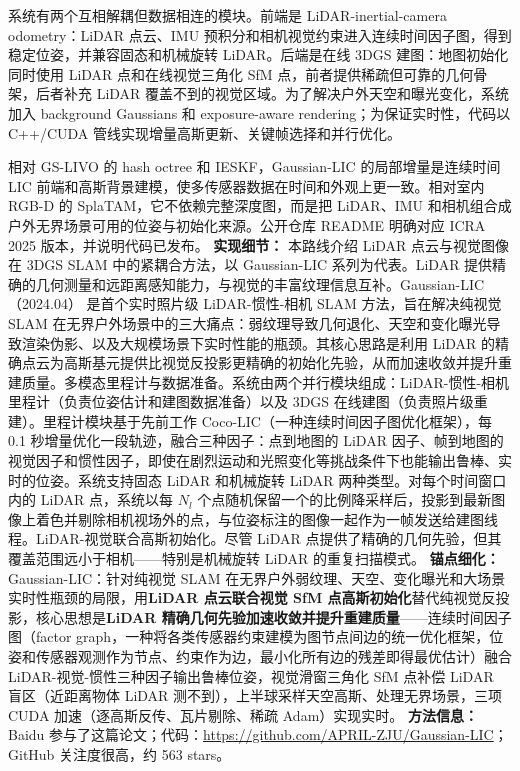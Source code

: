 系统有两个互相解耦但数据相连的模块。前端是 LiDAR-inertial-camera odometry：LiDAR 点云、IMU 预积分和相机视觉约束进入连续时间因子图，得到稳定位姿，并兼容固态和机械旋转 LiDAR。后端是在线 3DGS 建图：地图初始化同时使用 LiDAR 点和在线视觉三角化 SfM 点，前者提供稀疏但可靠的几何骨架，后者补充 LiDAR 覆盖不到的视觉区域。为了解决户外天空和曝光变化，系统加入 background Gaussians 和 exposure-aware rendering；为保证实时性，代码以 C++/CUDA 管线实现增量高斯更新、关键帧选择和并行优化。

相对 GS-LIVO 的 hash octree 和 IESKF，Gaussian-LIC 的局部增量是连续时间 LIC 前端和高斯背景建模，使多传感器数据在时间和外观上更一致。相对室内 RGB-D 的 SplaTAM，它不依赖完整深度图，而是把 LiDAR、IMU 和相机组合成户外无界场景可用的位姿与初始化来源。公开仓库 README 明确对应 ICRA 2025 版本，并说明代码已发布。
\textbf{实现细节：} 本路线介绍 LiDAR 点云与视觉图像在 3DGS SLAM 中的紧耦合方法，以 Gaussian-LIC 系列为代表。LiDAR 提供精确的几何测量和远距离感知能力，与视觉的丰富纹理信息互补。Gaussian-LIC（2024.04） 是首个实时照片级 LiDAR-惯性-相机 SLAM 方法，旨在解决纯视觉 SLAM 在无界户外场景中的三大痛点：弱纹理导致几何退化、天空和变化曝光导致渲染伪影、以及大规模场景下实时性能的瓶颈。其核心思路是利用 LiDAR 的精确点云为高斯基元提供比视觉反投影更精确的初始化先验，从而加速收敛并提升重建质量。多模态里程计与数据准备。系统由两个并行模块组成：LiDAR-惯性-相机里程计（负责位姿估计和建图数据准备）以及 3DGS 在线建图（负责照片级重建）。里程计模块基于先前工作 Coco-LIC（一种连续时间因子图优化框架），每 0.1 秒增量优化一段轨迹，融合三种因子：点到地图的 LiDAR 因子、帧到地图的视觉因子和惯性因子，即使在剧烈运动和光照变化等挑战条件下也能输出鲁棒、实时的位姿。系统支持固态 LiDAR 和机械旋转 LiDAR 两种类型。对每个时间窗口内的 LiDAR 点，系统以每 $N_l$ 个点随机保留一个的比例降采样后，投影到最新图像上着色并剔除相机视场外的点，与位姿标注的图像一起作为一帧发送给建图线程。LiDAR-视觉联合高斯初始化。尽管 LiDAR 点提供了精确的几何先验，但其覆盖范围远小于相机——特别是机械旋转 LiDAR 的重复扫描模式。
\textbf{锚点细化：} Gaussian-LIC：针对纯视觉 SLAM 在无界户外弱纹理、天空、变化曝光和大场景实时性瓶颈的局限，用\textbf{LiDAR 点云联合视觉 SfM 点高斯初始化}替代纯视觉反投影，核心思想是\textbf{LiDAR 精确几何先验加速收敛并提升重建质量}——连续时间因子图（factor graph，一种将各类传感器约束建模为图节点间边的统一优化框架，位姿和传感器观测作为节点、约束作为边，最小化所有边的残差即得最优估计）融合 LiDAR-视觉-惯性三种因子输出鲁棒位姿，视觉滑窗三角化 SfM 点补偿 LiDAR 盲区（近距离物体 LiDAR 测不到），上半球采样天空高斯、处理无界场景，三项 CUDA 加速（逐高斯反传、瓦片剔除、稀疏 Adam）实现实时。
\textbf{方法信息：} Baidu 参与了这篇论文；代码：\url{https://github.com/APRIL-ZJU/Gaussian-LIC}；GitHub 关注度很高，约 563 stars。



